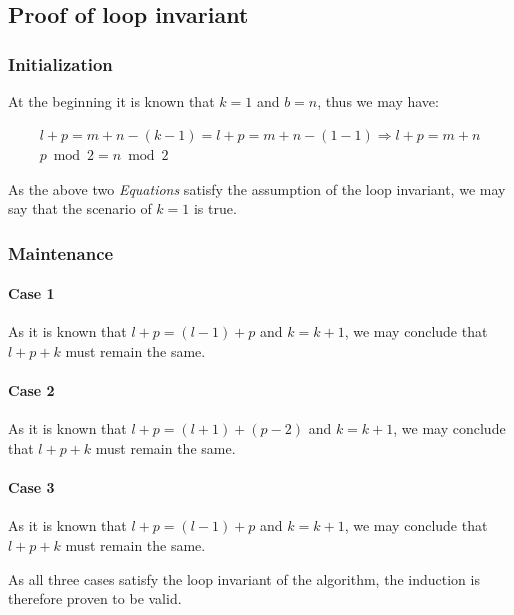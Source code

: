 \documentclass[12pt]{article}
\begin{document}
\subsection{Proof of loop invariant}
\subsubsection{Initialization}
At the beginning it is known that $k = 1$ and $b = n$, thus we may have:

\begin{gather}
    l + p = m + n - (k - 1) = l + p = m + n - (1 - 1) \Rightarrow l + p = m + n \\
    p\bmod 2 = n \bmod 2
\end{gather}

As the above two \textit{Equations} satisfy the assumption of the loop invariant, we may say that the scenario of $k = 1$ is true.

\subsubsection{Maintenance}

\paragraph{Case 1} As it is known that $l + p = (l - 1) + p$ and $k = k + 1$, we may conclude that $l + p + k$ must remain the same.

\paragraph{Case 2} As it is known that $l + p = (l + 1) + (p - 2)$ and $k = k + 1$, we may conclude that $l + p + k$ must remain the same.

\paragraph{Case 3} As it is known that $l + p = (l - 1) + p$ and $k = k + 1$, we may conclude that $l + p + k$ must remain the same.

As all three cases satisfy the loop invariant of the algorithm, the induction is therefore proven to be valid.





%
% 
% 
\end{document}
